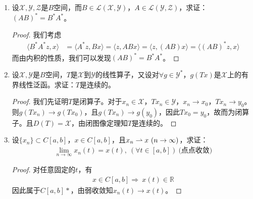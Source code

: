\begin{enumerate}[leftmargin=2cm, label=\arabic*]
\begin{enumerate}[leftmargin=1cm, label=(\arabic*)]
        \item $(A^*)^{-1} = (A^{-1})^*$。
        \begin{proof}
            由$A^*(A^*)^{-1}x^* = x^*$，两边同时作用$(A^*)^{-1}$，即证$(A^*)^{-1} = (A^{-1})^*$。
        \end{proof}
    \end{enumerate}

    \item 设$\mathscr{X},\mathscr{Y},\mathscr{Z}$是$B$空间，而$B\in\mathscr{L}(\mathscr{X},\mathscr{Y})$，$A\in\mathscr{L}(\mathscr{Y},\mathscr{Z})$，求证：$(AB)^* = B^*A^*$。
    \begin{proof}
        我们考虑
        \begin{align*}
            \langle B^*A^*z, x\rangle &= \langle A^*z, Bx\rangle = \langle z, ABx\rangle = \langle z, (AB)x\rangle = \langle (AB)^*z, x\rangle 
        \end{align*}
        而由内积的性质，我们可以发现$(AB)^* = B^*A^*$。
    \end{proof} 

    \item 设$\mathscr{X},\mathscr{Y}$是$B$空间，$T$是$\mathscr{X}$到$\mathscr{Y}$的线性算子，又设对$\forall g\in\mathscr{Y}^*$，$g(Tx)$是$\mathscr{X}$上的有界线性泛函。求证：$T$是连续的。
    \begin{proof}
        我们先证明$T$是闭算子。对于$x_n\in\mathscr{X}$，$Tx_n\in\mathscr{Y}$，$x_n\to x_0$，$Tx_n\to y_0$。则$g(Tx_n) \to g(Tx_0)$，且$g(Tx_n) \to g(y_0)$，因此$Tx_0 = y_0$，故而为闭算子。且$D(T) = \mathscr{X}$，由闭图像定理知$T$是连续的。
    \end{proof}

    \item 设$\{x_n\}\subset C[a,b]$，$x\in C[a,b]$，且$x_n\rightharpoonup x\ (n\to\infty)$，求证：
    \begin{align*}
        \lim\limits_{n\to\infty} x_n(t) = x(t),\ (\forall t\in[a,b]) \ \text{(点点收敛)}
    \end{align*}
    \begin{proof}
        对任意固定的$t$，有
        \begin{align*}
            x\in C[a,b] \Rightarrow \ x(t)\in\mathbb{R}
        \end{align*}
        因此属于$C[a,b]*$，由弱收敛知$x_n(t)\to x(t)$。
    \end{proof}


\end{enumerate}
